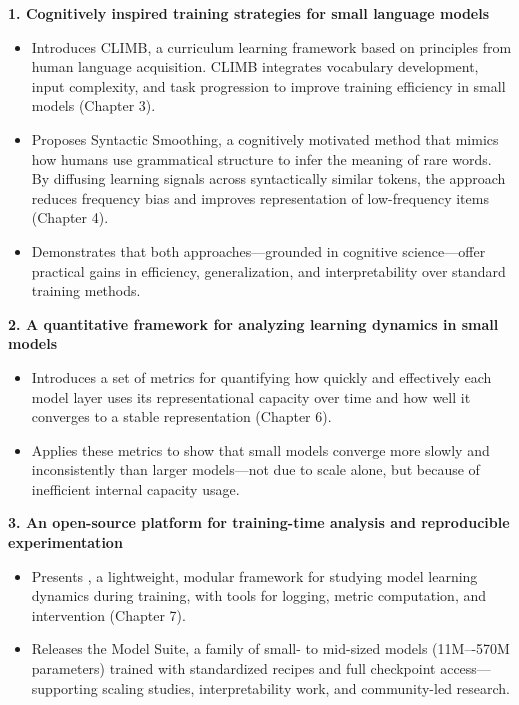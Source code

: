 \vspace{1em}

\textbf{1. Cognitively inspired training strategies for small language models}

\begin{itemize}

    \item Introduces CLIMB, a curriculum learning framework based on principles from human language acquisition. CLIMB integrates vocabulary development, input complexity, and task progression to improve training efficiency in small models (Chapter 3).

    \item Proposes Syntactic Smoothing, a cognitively motivated method that mimics how humans use grammatical structure to infer the meaning of rare words. By diffusing learning signals across syntactically similar tokens, the approach reduces frequency bias and improves representation of low-frequency items (Chapter 4).

    \item Demonstrates that both approaches—grounded in cognitive science—offer practical gains in efficiency, generalization, and interpretability over standard training methods.
\end{itemize}

\textbf{2. A quantitative framework for analyzing learning dynamics in small models}

\begin{itemize}
    \item Introduces a set of metrics for quantifying how quickly and effectively each model layer uses its representational capacity over time and how well it converges to a stable representation (Chapter 6).

    \item Applies these metrics to show that small models converge more slowly and inconsistently than larger models—not due to scale alone, but because of inefficient internal capacity usage.
\end{itemize}

\textbf{3. An open-source platform for training-time analysis and reproducible experimentation}
\begin{itemize}
    \item Presents \pico, a lightweight, modular framework for studying model learning dynamics during training, with tools for logging, metric computation, and intervention (Chapter 7).

    \item Releases the \pico Model Suite, a family of small- to mid-sized models (11M–-570M parameters) trained with standardized recipes and full checkpoint access—supporting scaling studies, interpretability work, and community-led research.
\end{itemize}

